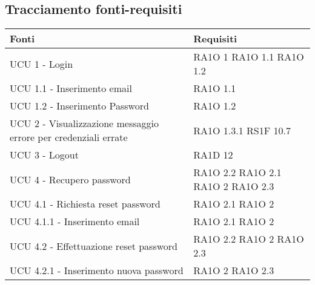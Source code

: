\subsection{Tracciamento fonti-requisiti}
			\begin{center}
			\bgroup
			\def\arraystretch{1.8}
			\begin{longtable}{ | p{5cm} | p{5cm} |}
		
			\cellcolor[gray]{0.9} \textbf{Fonti} & \cellcolor[gray]{0.9} \textbf{Requisiti} \\ \hline       
						UCU 1 - Login &  RA1O 1 \newline  RA1O 1.1 \newline  RA1O 1.2 \newline  \\ \hline      
						UCU 1.1 - Inserimento email &  RA1O 1.1 \newline  \\ \hline      
						UCU 1.2 - Inserimento Password &  RA1O 1.2 \newline  \\ \hline      
						UCU 2 - Visualizzazione messaggio errore per credenziali errate &  RA1O 1.3.1 \newline  RS1F 10.7 \newline  \\ \hline      
						UCU 3 - Logout &  RA1D 12 \newline  \\ \hline      
						UCU 4 - Recupero password &  RA1O 2.2 \newline  RA1O 2.1 \newline  RA1O 2 \newline  RA1O 2.3 \newline  \\ \hline      
						UCU 4.1 - Richiesta reset password &  RA1O 2.1 \newline  RA1O 2 \newline  \\ \hline      
						UCU 4.1.1 - Inserimento email &  RA1O 2.1 \newline  RA1O 2 \newline  \\ \hline      
						UCU 4.2 - Effettuazione reset password &  RA1O 2.2 \newline  RA1O 2 \newline  RA1O 2.3 \newline  \\ \hline      
						UCU 4.2.1 - Inserimento nuova password &  RA1O 2 \newline  RA1O 2.3 \newline  \\ \hline      

\end{longtable}
\end{center}
